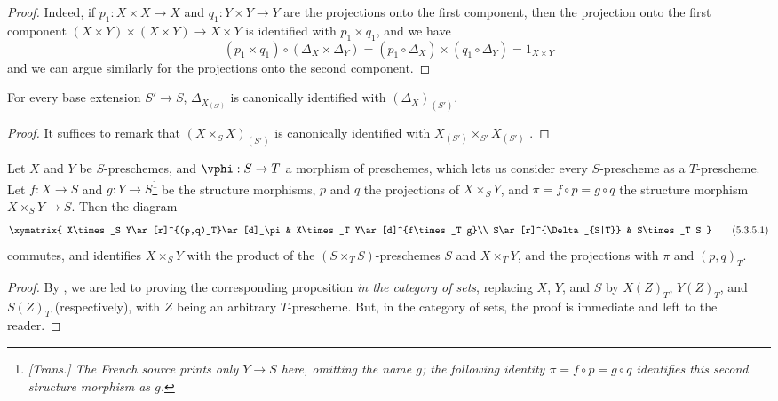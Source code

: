 \begin{proof}
Indeed, if $p_1:X\times X\to X$ and $q_1:Y\times Y\to Y$ are the projections onto the first component, then the projection onto the first component $(X\times Y)\times(X\times Y)\to X\times Y$ is identified with $p_1\times q_1$, and we have
\[
  (p_1\times q_1)\circ(\Delta_X\times\Delta_Y)=(p_1\circ\Delta_X)\times(q_1\circ\Delta_Y)=1_{X\times Y}
\]
and we can argue similarly for the projections onto the second component.
\end{proof}

\label{I.5.3.3}

\begin{corollary}[5.3.4]
\label{I.5.3.4}
For every base extension $S'\to S$, $\Delta_{X_{(S')}}$ is canonically identified with $(\Delta_X)_{(S')}$.
\end{corollary}

\begin{proof}
It suffices to remark that $(X\times_S X)_{(S')}$ is canonically identified with $X_{(S')}\times_{S'}X_{(S')}$ .
\end{proof}

\begin{proposition}[5.3.5]
\label{I.5.3.5}
Let $X$ and $Y$ be $S$-preschemes, and $\vphi:S\to T$ a morphism of preschemes, which lets us consider every $S$-prescheme as a $T$-prescheme.
Let $f:X\to S$ and $g:Y\to S$\footnote{\emph{[Trans.] The French source prints only $Y\to S$ here, omitting the name $g$; the following identity $\pi=f\circ p=g\circ q$ identifies this second structure morphism as $g$.}} be the structure morphisms, $p$ and $q$ the projections of $X\times_S Y$, and $\pi=f\circ p=g\circ q$ the structure morphism $X\times_S Y\to S$.
Then the diagram
\[
\label{I.5.3.5.1}
  \xymatrix{
    X\times_S Y\ar[r]^{(p,q)_T}\ar[d]_\pi &
    X\times_T Y\ar[d]^{f\times_T g}\\
    S\ar[r]^{\Delta_{S|T}} &
    S\times_T S
  }
  \tag{5.3.5.1}
\]
commutes, and identifies $X\times_S Y$ with the product of the $(S\times_T S)$-preschemes $S$ and $X\times_T Y$, and the projections with $\pi$ and $(p,q)_T$.
\end{proposition}

\begin{proof}
By , we are led to proving the corresponding proposition \emph{in the category of sets}, replacing $X$, $Y$, and $S$ by $X(Z)_T$, $Y(Z)_T$, and $S(Z)_T$ (respectively), with $Z$ being an arbitrary $T$-prescheme.
But, in the category of sets, the proof is immediate and left to the reader.
\end{proof}

